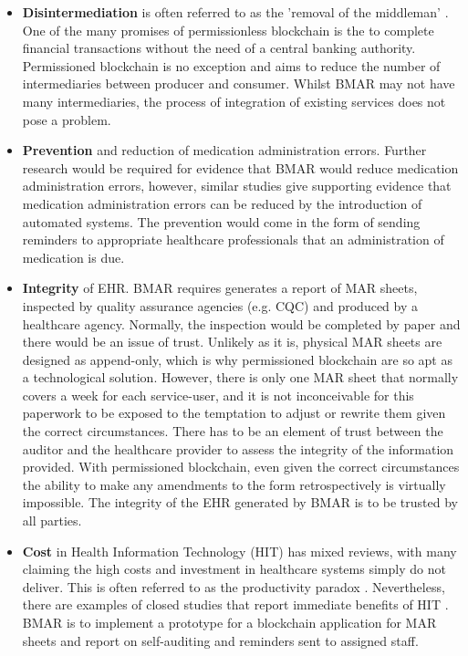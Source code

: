 \documentclass[runningheads]{llncs}
\begin{document}
\begin{itemize}
	\item {\bf Disintermediation} is often referred to as the 'removal of the middleman' \cite[ch. 1]{hyperledger:gaur2018}. One of the many promises of permissionless blockchain is the to complete financial transactions without the need of a central banking authority. Permissioned blockchain is no exception and aims to reduce the number of intermediaries between producer and consumer. Whilst BMAR may not have many intermediaries, the process of integration of existing services does not pose a problem. 
 	\item{\bf Prevention} and reduction of medication administration errors. Further research would be required for evidence that BMAR would reduce medication administration errors, however, similar studies \cite{bates1998effect,bennett2003computerised} give supporting evidence that medication administration errors can be reduced by the introduction of automated systems. The prevention would come in the form of sending reminders to appropriate healthcare professionals that an administration of medication is due. 
	\item {\bf Integrity} of EHR. BMAR requires generates a report of MAR sheets, inspected by quality assurance agencies (e.g. CQC) and produced by a healthcare agency. Normally, the inspection would be completed by paper and there would be an issue of trust. Unlikely as it is, physical MAR sheets are designed as append-only, which is why permissioned blockchain are so apt as a technological solution. However, there is only one MAR sheet that normally covers a week for each service-user, and it is not inconceivable for this paperwork to be exposed to the temptation to adjust or rewrite them given the correct circumstances. There has to be an element of trust between the auditor and the healthcare provider to assess the integrity of the information provided. With permissioned blockchain, even given the correct circumstances the ability to make any amendments to the form retrospectively is virtually impossible. The integrity of the EHR generated by BMAR is to be trusted by all parties.
	\item{\bf Cost} in Health Information Technology (HIT) has mixed reviews, with many claiming the high costs and investment \cite{adler2011survey} in healthcare systems simply do not deliver. This is often referred to as the productivity paradox \cite{bui2018cacm}. Nevertheless, there are examples of closed studies that report immediate benefits of HIT \cite{bennett2003computerised,bates1998effect}. BMAR is to implement a prototype for a blockchain application for MAR sheets and report on self-auditing and reminders sent to assigned staff. 

\end{itemize}
\end{document}
